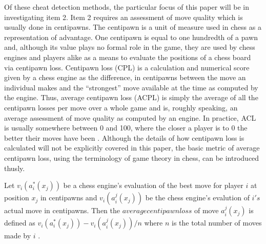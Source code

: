 \documentclass[12pt, letterpaper, titlepage]{article}
\begin{document}
Of these cheat detection methods, the particular focus of this paper will be in investigating item 2. Item 2
 requires an assessment of move quality which is usually done in centipawns. The centipawn is a unit of measure
  used in chess as a representation of advantage. One centipawn is equal to one hundredth of a pawn and, 
  although its value plays no formal role in the game, they are used by chess engines and players alike as a
   means to evaluate the positions of a chess board via centipawn loss. Centipawn loss (CPL) is a calculation 
   and numerical score given by a chess engine as the difference, in centipawns between the move an individual 
   makes and the “strongest” move available at the time as computed by the engine. Thus, average centipawn loss 
   (ACPL) is simply the average of all the centipawn losses per move over a whole game and is, roughly
    speaking, an average assessment of move quality as computed by an engine. In practice, ACL is usually 
    somewhere between 0 and 100, where the closer a player is to 0 the better their moves have been 
    \citep{avva2022guess}. Although the details of how centipawn loss is calculated will not be explicitly
     covered in this paper, the basic metric of average centipawn loss, using the terminology of game theory
      in chess, can be introduced thusly.

Let \begin{math}v_{i}(a_{i}^*(x_{j}))\end{math} be a chess engine's evaluation of the best move for player 
\begin{math}i\end{math} at position \begin{math}x_{j}\end{math} in centipawns and 
\begin{math}v_{i}(a_{i}^j(x_{j}))\end{math} be the chess engine's evalution of \begin{math}i's\end{math} 
actual move in centipawns. Then the \begin{math}average centipawn loss\end{math} of move 
\begin{math}a_{i}^j(x_{j})\end{math} is defined as \begin{math}v_{i}(a_{i}^*(x_{j})) - v_{i}(a_{i}^j(x_{j}))/n\end{math} 
where \begin{math}n\end{math} is the total number of moves made by \begin{math}i\end{math} \citep{anbarciai}.
\end{document}
